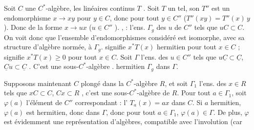 \documentclass[11pt,a4paper]{article}
\begin{document}

Soit $C$ une $C^{*}$-algèbre,   les \ill{}  linéaires continus $T$  . Soit $T$ un tel, son  $T''$ est un endomorphisme      $x \to xy$  pour $y \in C$, donc pour tout $y \in C''$ ($T''(xy) = T''(x)\,y$ \struck{\ill{}}   \ill{} ). Donc de la forme $x \to ux$ ($u \in C''$  ). ,  : l'ens. $\Gamma_g$ des  $u$ de $C''$ tels que $uC \subset C$. On voit donc que l'ensemble d'endomorphismes \ill{} considéré est isomorphe, avec sa structure d'algèbre normée, à $\Gamma_g$. \struck{\ill{}}  signifie $x^{*}T(x)$ hermitien pour tout $x \in C$ ;  signifie $x^{*}T(x) \geq 0$ pour tout $x \in C$. Soit \struck{\ill{}} $\Gamma$ l'ens. des $u \in C''$ tels que $u\underline{C} \subset \underline{C}$, $\underline{C}u \subset \underline{C}$ . C'est une sous-$C^{*}$-algèbre .  hermitien  $\Gamma_g$  dans $\Gamma$.

Supposons maintenant $C$ plongé dans la $C^{*}$-algèbre $R$, et soit $\Gamma_1$ l'ens. des $x \in R$ tels que $xC \subset C$, $Cx \subset R$ , c'est une sous-$C^{*}$-algèbre de $R$. Pour tout $a \in \Gamma_1$, soit $\varphi(a)$ l'élément de $C''$ correspondant : l' $T_a(x) = ax$ dans $C$. Si $a$ hermitien, $\varphi(a)$ est hermitien, donc dans $\Gamma$, donc pour tout $a \in \Gamma_1$, $\varphi(a) \in \Gamma$. De plus, $\varphi$ est évidemment une représentation d'algèbres, compatible avec l'involution (car \ill{}
\end{document}
